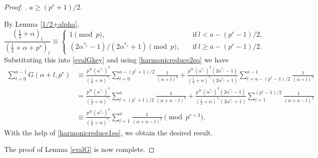 \documentclass[10pt,a4paper]{amsart}
\def\eq{\equiv}
\def\f{\frac}
\def\t{\text}
\begin{document}
\begin{proof}
\medskip

. $a\geq(p^r+1)/2$. 

\medskip

By Lemma \ref{1/2+alpha},
$$
\f{(\f12+\alpha)_l}{(\f12+\alpha+p^r)_l}\eq\begin{cases}1\pmod{p},\quad&\t{if}\ l<a-(p^r-1)/2,\\ (2\alpha^{\ast_r}-1)/(2\alpha^{\ast_r}+1)\pmod{p},\quad&\t{if}\ l\geq a-(p^r-1)/2.\end{cases}
$$
Substituting this into \eqref{evalGkey} and using \eqref{harmonicreduce2eq} we have
\begin{align*}
\sum_{l=0}^{a-1}G(\alpha+l,p^r)&\eq \f{p^{3r}(\alpha^{\ast_r})^3}{(\f12+\alpha)^{\ast_r}}\sum_{l=0}^{a-(p^r+1)/2}\f{1}{(\alpha+l)^2}+\f{p^{3r}(\alpha^{\ast_r})^3(2\alpha^{\ast_r}-1)}{(\f12+\alpha)^{\ast_r}(2\alpha^{\ast_r}+1)}\sum_{l=a-(p^r-1)/2}^{a-1}\f{1}{(\alpha+l)^2}\\
&=\f{p^{3r}(\alpha^{\ast_r})^3}{(\f12+\alpha)^{\ast_r}}\sum_{l=(p^r+1)/2}^{a}\f{1}{(\alpha+a-l)^2}+\f{p^{3r}(\alpha^{\ast_r})^3(2\alpha^{\ast_r}-1)}{(\f12+\alpha)^{\ast_r}(2\alpha^{\ast_r}+1)}\sum_{l=1}^{(p^r-1)/2}\f{1}{(\alpha+a-l)^2}\\
&\eq \f{p^{3r}(\alpha^{\ast_r})^3}{(\f12+\alpha)^{\ast_r}}\sum_{l=1}^{a}\f{1}{(\alpha+a-l)^2}\pmod{p^{r+3}}.
\end{align*}
With the help of \eqref{harmonicreduce1eq}, we obtain the desired result.

The proof of Lemma \ref{evalG} is now complete.
\end{proof}
\end{document}
